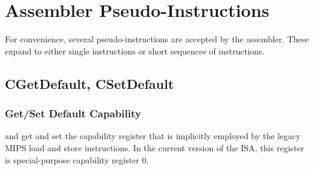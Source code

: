 


%



%
%



















































\clearpage
\section{Assembler Pseudo-Instructions}

For convenience, several pseudo-instructions are accepted by the assembler.
These expand to either single instructions or short sequences of instructions.

\subsection{CGetDefault, CSetDefault}
\subsubsection*{Get/Set Default Capability}

 and  get and set the capability register that
is implicitly employed by the legacy MIPS load and store instructions.
In the current version of the ISA, this register is special-purpose capability
register 0.

